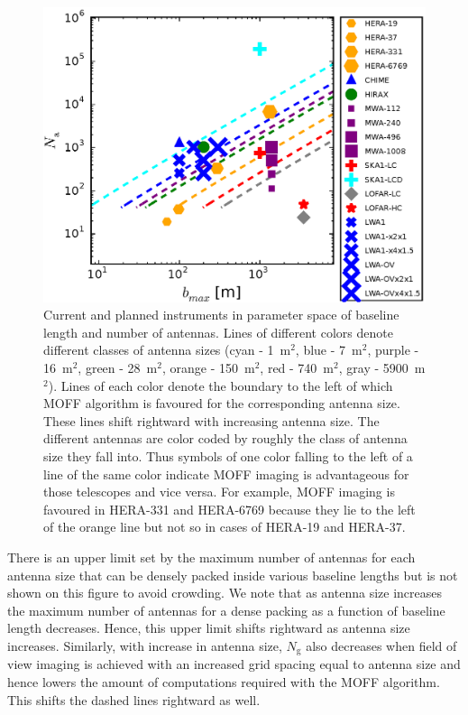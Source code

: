 \documentclass[a4paper,fleqn,usenatbib]{mnras}
\newcommand{\Ngrid}{N_\textrm{g}}
\begin{document}
\begin{figure}
  \includegraphics[width=\columnwidth]{figure12}
  \caption{Current and planned instruments in parameter space of baseline length and number of antennas. Lines of different colors denote different classes of antenna sizes (cyan - 1~m$^2$, blue - 7~m$^2$, purple - 16~m$^2$, green - 28~m$^2$, orange - 150~m$^2$, red - 740~m$^2$, gray - 5900~m$^2$). Lines of each color denote the boundary to the left of which MOFF algorithm is favoured for the corresponding antenna size. These lines shift rightward with increasing antenna size. The different antennas are color coded by roughly the class of antenna size they fall into. Thus symbols of one color falling to the left of a line of the same color indicate MOFF imaging is advantageous for those telescopes and vice versa. For example, MOFF imaging is favoured in HERA-331 and HERA-6769 because they lie to the left of the orange line but not so in cases of HERA-19 and HERA-37.}
  \label{fig:parameter-space-bll-nant-instruments}
\end{figure}

There is an upper limit set by the maximum number of antennas for each antenna size that can be densely packed inside various baseline lengths but is not shown on this figure to avoid crowding. We note that as antenna size increases the maximum number of antennas for a dense packing as a function of baseline length decreases. Hence, this upper limit shifts rightward as antenna size increases. Similarly, with increase in antenna size, $\Ngrid$ also decreases when field of view imaging is achieved with an increased grid spacing equal to antenna size and hence lowers the amount of computations required with the MOFF algorithm. This shifts the dashed lines rightward as well.
\end{document}
